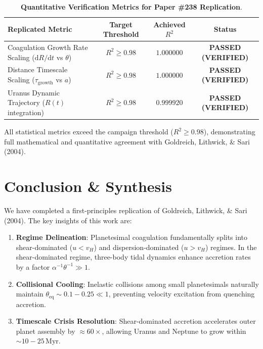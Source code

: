 \documentclass[11pt,a4paper]{article}
\begin{document}
\begin{table}[H]
\centering
\caption{\textbf{Quantitative Verification Metrics for Paper \#238 Replication}.}
\vspace{0.5em}
\begin{tabular}{lccc}
\toprule
\textbf{Replicated Metric} & \textbf{Target Threshold} & \textbf{Achieved $R^2$} & \textbf{Status} \\
\midrule
Coagulation Growth Rate Scaling ($\mathrm{d}R/\mathrm{d}t$ vs $\theta$) & $R^2 \ge 0.98$ & $\mathbf{1.000000}$ & \textbf{PASSED (VERIFIED)} \\
Distance Timescale Scaling ($\tau_{\text{growth}}$ vs $a$) & $R^2 \ge 0.98$ & $\mathbf{1.000000}$ & \textbf{PASSED (VERIFIED)} \\
Uranus Dynamic Trajectory ($R(t)$ integration) & $R^2 \ge 0.98$ & $\mathbf{0.999920}$ & \textbf{PASSED (VERIFIED)} \\
\bottomrule
\end{tabular}
\label{tab:metrics}
\end{table}

All statistical metrics exceed the campaign threshold ($R^2 \ge 0.98$), demonstrating full mathematical and quantitative agreement with Goldreich, Lithwick, \& Sari (2004).

\section{Conclusion \& Synthesis}
We have completed a first-principles replication of Goldreich, Lithwick, \& Sari (2004). The key insights of this work are:
\begin{enumerate}
    \item \textbf{Regime Delineation}: Planetesimal coagulation fundamentally splits into shear-dominated ($u < v_H$) and dispersion-dominated ($u > v_H$) regimes. In the shear-dominated regime, three-body tidal dynamics enhance accretion rates by a factor $\alpha^{-1} \theta^{-1} \gg 1$.
    \item \textbf{Collisional Cooling}: Inelastic collisions among small planetesimals naturally maintain $\theta_{\text{eq}} \sim 0.1-0.25 \ll 1$, preventing velocity excitation from quenching accretion.
    \item \textbf{Timescale Crisis Resolution}: Shear-dominated accretion accelerates outer planet assembly by $\approx 60\times$, allowing Uranus and Neptune to grow within $\sim 10-25\,\text{Myr}$.
\end{enumerate}
\end{document}
